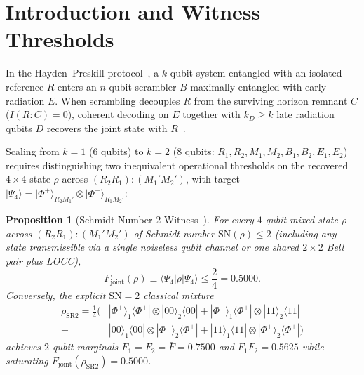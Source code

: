 \documentclass[11pt,twocolumn]{article}
\newtheorem{proposition}{Proposition}
\begin{document}
\section{Introduction and Witness Thresholds}
In the Hayden--Preskill protocol~\cite{HaydenPreskill2007}, a $k$-qubit system entangled with an isolated reference $R$ enters an $n$-qubit scrambler $B$ maximally entangled with early radiation $E$. When scrambling decouples $R$ from the surviving horizon remnant $C$ ($I(R:C)=0$), coherent decoding on $E$ together with $k_D\ge k$ late radiation qubits $D$ recovers the joint state with $R$~\cite{YoshidaKitaev2017,Landsman2019}.

Scaling from $k=1$ ($6$ qubits) to $k=2$ ($8$ qubits: $R_1,R_2,M_1,M_2,B_1,B_2,E_1,E_2$) requires distinguishing two inequivalent operational thresholds on the recovered $4\times 4$ state $\rho$ across $(R_2 R_1):(M_1' M_2')$, with target $|\Psi_4\rangle = |\Phi^+\rangle_{R_2 M_1'}\otimes|\Phi^+\rangle_{R_1 M_2'}$:

\begin{proposition}[Schmidt-Number-2 Witness~\cite{TerhalHorodecki2000}]
For every $4$-qubit mixed state $\rho$ across $(R_2 R_1):(M_1' M_2')$ of Schmidt number $\mathrm{SN}(\rho)\le 2$ (including any state transmissible via a single noiseless qubit channel or one shared $2\times 2$ Bell pair plus LOCC),
\begin{equation}
F_{\mathrm{joint}}(\rho) \equiv \langle \Psi_4|\rho|\Psi_4\rangle \le \frac{2}{4} = 0.5000.
\label{eq:sn2_bound}
\end{equation}
Conversely, the explicit $\mathrm{SN}=2$ classical mixture
\begin{align}
\rho_{\mathrm{SR2}} = \frac{1}{4}\Big(
&|\Phi^+\rangle_1\langle\Phi^+|\otimes |00\rangle_2\langle 00|
+ |\Phi^+\rangle_1\langle\Phi^+|\otimes |11\rangle_2\langle 11| \nonumber\\
+\,&|00\rangle_1\langle 00|\otimes |\Phi^+\rangle_2\langle\Phi^+|
+ |11\rangle_1\langle 11|\otimes |\Phi^+\rangle_2\langle\Phi^+| \Big)
\end{align}
achieves $2$-qubit marginals $F_1=F_2=\bar{F}=0.7500$ and $F_1 F_2 = 0.5625$ while saturating $F_{\mathrm{joint}}(\rho_{\mathrm{SR2}})=0.5000$.
\end{proposition}
\end{document}
